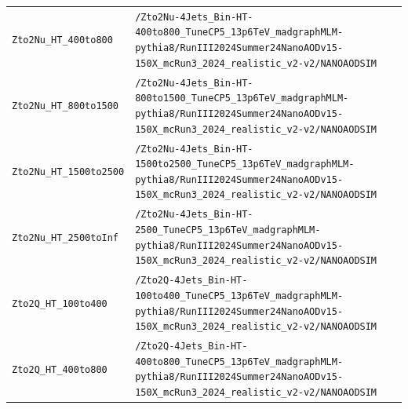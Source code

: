 \begin{longtable}{@{}>{\RaggedRight\arraybackslash}p{} >{\RaggedRight\arraybackslash}p{}@{}}
\addlinespace[2pt]
\texttt{Zto2Nu\_\allowbreak{}HT\_\allowbreak{}400to800} & \texttt{/\allowbreak{}Zto2Nu-\allowbreak{}4Jets\_\allowbreak{}Bin-\allowbreak{}HT-\allowbreak{}400to800\_\allowbreak{}TuneCP5\_\allowbreak{}13p6TeV\_\allowbreak{}madgraphMLM-\allowbreak{}pythia8/\allowbreak{}RunIII2024Summer24NanoAODv15-\allowbreak{}150X\_\allowbreak{}mcRun3\_\allowbreak{}2024\_\allowbreak{}realistic\_\allowbreak{}v2-\allowbreak{}v2/\allowbreak{}NANOAODSIM} \\
\addlinespace[2pt]
\texttt{Zto2Nu\_\allowbreak{}HT\_\allowbreak{}800to1500} & \texttt{/\allowbreak{}Zto2Nu-\allowbreak{}4Jets\_\allowbreak{}Bin-\allowbreak{}HT-\allowbreak{}800to1500\_\allowbreak{}TuneCP5\_\allowbreak{}13p6TeV\_\allowbreak{}madgraphMLM-\allowbreak{}pythia8/\allowbreak{}RunIII2024Summer24NanoAODv15-\allowbreak{}150X\_\allowbreak{}mcRun3\_\allowbreak{}2024\_\allowbreak{}realistic\_\allowbreak{}v2-\allowbreak{}v2/\allowbreak{}NANOAODSIM} \\
\addlinespace[2pt]
\texttt{Zto2Nu\_\allowbreak{}HT\_\allowbreak{}1500to2500} & \texttt{/\allowbreak{}Zto2Nu-\allowbreak{}4Jets\_\allowbreak{}Bin-\allowbreak{}HT-\allowbreak{}1500to2500\_\allowbreak{}TuneCP5\_\allowbreak{}13p6TeV\_\allowbreak{}madgraphMLM-\allowbreak{}pythia8/\allowbreak{}RunIII2024Summer24NanoAODv15-\allowbreak{}150X\_\allowbreak{}mcRun3\_\allowbreak{}2024\_\allowbreak{}realistic\_\allowbreak{}v2-\allowbreak{}v2/\allowbreak{}NANOAODSIM} \\
\addlinespace[2pt]
\texttt{Zto2Nu\_\allowbreak{}HT\_\allowbreak{}2500toInf} & \texttt{/\allowbreak{}Zto2Nu-\allowbreak{}4Jets\_\allowbreak{}Bin-\allowbreak{}HT-\allowbreak{}2500\_\allowbreak{}TuneCP5\_\allowbreak{}13p6TeV\_\allowbreak{}madgraphMLM-\allowbreak{}pythia8/\allowbreak{}RunIII2024Summer24NanoAODv15-\allowbreak{}150X\_\allowbreak{}mcRun3\_\allowbreak{}2024\_\allowbreak{}realistic\_\allowbreak{}v2-\allowbreak{}v2/\allowbreak{}NANOAODSIM} \\
\addlinespace[2pt]
\texttt{Zto2Q\_\allowbreak{}HT\_\allowbreak{}100to400} & \texttt{/\allowbreak{}Zto2Q-\allowbreak{}4Jets\_\allowbreak{}Bin-\allowbreak{}HT-\allowbreak{}100to400\_\allowbreak{}TuneCP5\_\allowbreak{}13p6TeV\_\allowbreak{}madgraphMLM-\allowbreak{}pythia8/\allowbreak{}RunIII2024Summer24NanoAODv15-\allowbreak{}150X\_\allowbreak{}mcRun3\_\allowbreak{}2024\_\allowbreak{}realistic\_\allowbreak{}v2-\allowbreak{}v2/\allowbreak{}NANOAODSIM} \\
\addlinespace[2pt]
\texttt{Zto2Q\_\allowbreak{}HT\_\allowbreak{}400to800} & \texttt{/\allowbreak{}Zto2Q-\allowbreak{}4Jets\_\allowbreak{}Bin-\allowbreak{}HT-\allowbreak{}400to800\_\allowbreak{}TuneCP5\_\allowbreak{}13p6TeV\_\allowbreak{}madgraphMLM-\allowbreak{}pythia8/\allowbreak{}RunIII2024Summer24NanoAODv15-\allowbreak{}150X\_\allowbreak{}mcRun3\_\allowbreak{}2024\_\allowbreak{}realistic\_\allowbreak{}v2-\allowbreak{}v2/\allowbreak{}NANOAODSIM} \\

\end{longtable}
